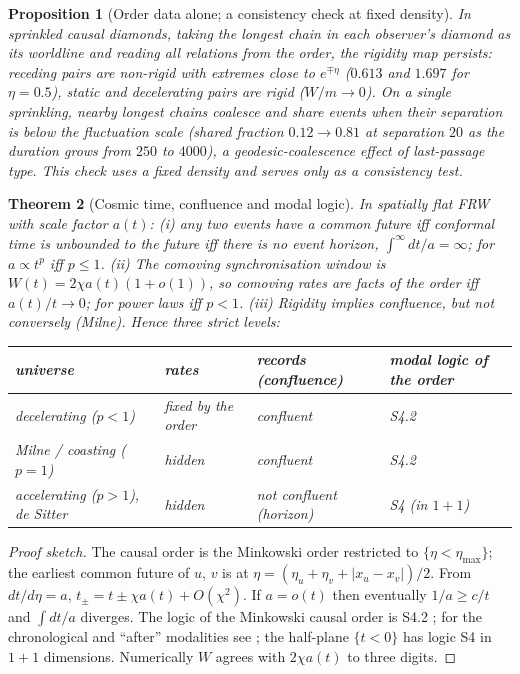 \documentclass[11pt]{article}
\newtheorem{theorem}{Theorem}
\newtheorem{proposition}[theorem]{Proposition}
\theoremstyle{definition}
\theoremstyle{remark}
\begin{document}
\begin{proposition}[Order data alone; a consistency check at fixed density]
In sprinkled causal diamonds, taking the longest chain in each observer's diamond as its worldline and reading all relations from the order, the rigidity map persists: receding pairs are non-rigid with extremes close to $e^{\mp\eta}$ ($0.613$ and $1.697$ for $\eta=0.5$), static and decelerating pairs are rigid ($W/m\to0$). On a single sprinkling, nearby longest chains coalesce and share events when their separation is below the fluctuation scale (shared fraction $0.12\to0.81$ at separation $20$ as the duration grows from $250$ to $4000$), a geodesic-coalescence effect of last-passage type. This check uses a fixed density and serves only as a consistency test.
\end{proposition}

\begin{theorem}[Cosmic time, confluence and modal logic]\label{thm:frw}
In spatially flat FRW with scale factor $a(t)$:
(i) any two events have a common future iff conformal time is unbounded to the future iff there is no event horizon, $\int^\infty dt/a=\infty$; for $a\propto t^p$ iff $p\le1$.
(ii) The comoving synchronisation window is $W(t)=2\chi a(t)(1+o(1))$, so comoving rates are facts of the order iff $a(t)/t\to0$; for power laws iff $p<1$.
(iii) Rigidity implies confluence, but not conversely (Milne). Hence three strict levels:
\begin{center}\small
\begin{tabular}{llll}\toprule
universe & rates & records (confluence) & modal logic of the order\\\midrule
decelerating ($p<1$) & fixed by the order & confluent & S4.2\\
Milne / coasting ($p=1$) & hidden & confluent & S4.2\\
accelerating ($p>1$), de Sitter & hidden & not confluent (horizon) & S4 (in $1+1$)\\\bottomrule
\end{tabular}
\end{center}
\end{theorem}
\begin{proof}[Proof sketch]
The causal order is the Minkowski order restricted to $\{\eta<\eta_{\max}\}$; the earliest common future of $u$, $v$ is at $\eta=(\eta_u+\eta_v+|x_u-x_v|)/2$. From $dt/d\eta=a$, $t_\pm=t\pm\chi a(t)+O(\chi^2)$. If $a=o(t)$ then eventually $1/a\ge c/t$ and $\int dt/a$ diverges. The logic of the Minkowski causal order is S4.2 \cite{goldblatt}; for the chronological and ``after'' modalities see \cite{shapirovsky,lewisschaaf}; the half-plane $\{t<0\}$ has logic S4 in $1+1$ dimensions. Numerically $W$ agrees with $2\chi a(t)$ to three digits.
\end{proof}
\end{document}
